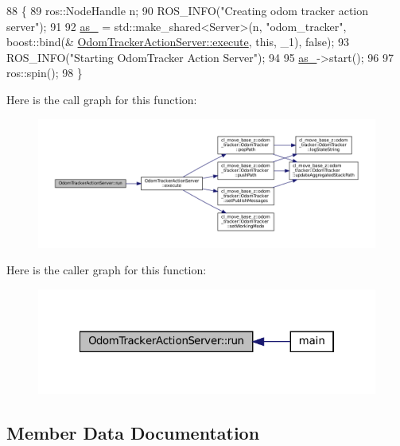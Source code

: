 \begin{DoxyCode}
88   \{
89     ros::NodeHandle n;
90     ROS\_INFO(\textcolor{stringliteral}{"Creating odom tracker action server"});
91 
92     \hyperlink{classOdomTrackerActionServer_a28bed1d95003d837b2b47053dbc66878}{as\_} = std::make\_shared<Server>(n, \textcolor{stringliteral}{"odom\_tracker"}, boost::bind(&
      \hyperlink{classOdomTrackerActionServer_afa69287377bb2a12c5346cbe8d68cb04}{OdomTrackerActionServer::execute}, \textcolor{keyword}{this}, \_1), \textcolor{keyword}{false});
93     ROS\_INFO(\textcolor{stringliteral}{"Starting OdomTracker Action Server"});
94 
95     \hyperlink{classOdomTrackerActionServer_a28bed1d95003d837b2b47053dbc66878}{as\_}->start();
96 
97     ros::spin();
98   \}
\end{DoxyCode}
Here is the call graph for this function\+:
\nopagebreak
\begin{figure}[H]
\begin{center}
\leavevmode
\includegraphics[width=350pt]{classOdomTrackerActionServer_a8ab6984c7383949a048d72437e9f79d3_cgraph}
\end{center}
\end{figure}
Here is the caller graph for this function\+:
\nopagebreak
\begin{figure}[H]
\begin{center}
\leavevmode
\includegraphics[width=322pt]{classOdomTrackerActionServer_a8ab6984c7383949a048d72437e9f79d3_icgraph}
\end{center}
\end{figure}


\subsection{Member Data Documentation}
\mbox{\label{classOdomTrackerActionServer_a28bed1d95003d837b2b47053dbc66878}} 
